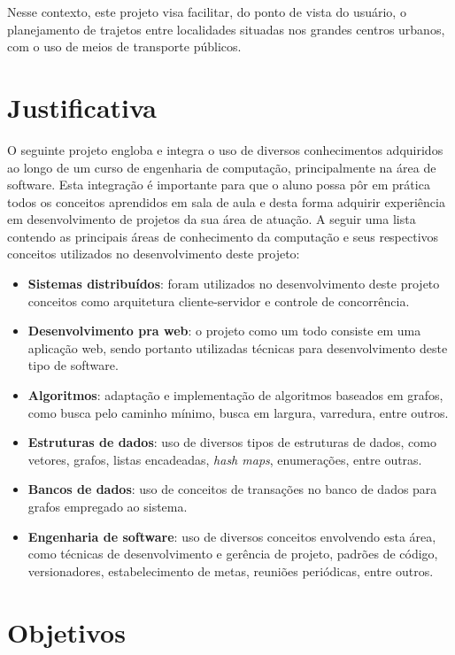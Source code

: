 Nesse contexto, este projeto visa facilitar, do ponto de vista do usuário, o planejamento de trajetos entre localidades situadas nos grandes centros urbanos, com o uso de meios de transporte públicos.

\section{Justificativa}
O seguinte projeto engloba e integra o uso de diversos conhecimentos adquiridos ao longo de um curso de engenharia de computação, principalmente na área de software.
Esta integração é importante para que o aluno possa pôr em prática todos os conceitos aprendidos em sala de aula e desta forma adquirir experiência em desenvolvimento de projetos da sua área de atuação.
A seguir uma lista contendo as principais áreas de conhecimento da computação e seus respectivos conceitos utilizados no desenvolvimento deste projeto:

\begin{itemize}
	\item \textbf{Sistemas distribuídos}: foram utilizados no desenvolvimento deste projeto conceitos como arquitetura cliente-servidor e controle de concorrência.
	\item \textbf{Desenvolvimento pra web}: o projeto como um todo consiste em uma aplicação web, sendo portanto utilizadas técnicas para desenvolvimento deste tipo de 	software.
	\item \textbf{Algoritmos}: adaptação e implementação de algoritmos baseados em grafos, como busca pelo caminho mínimo, busca em largura, varredura, entre outros.
	\item \textbf{Estruturas de dados}: uso de diversos tipos de estruturas de dados, como vetores, grafos, listas encadeadas, \emph{hash maps}, enumerações, entre 		outras.
	\item \textbf{Bancos de dados}: uso de conceitos de transações no banco de dados para grafos empregado ao sistema. 
	\item \textbf{Engenharia de software}: uso de diversos conceitos envolvendo esta área, como técnicas de desenvolvimento e gerência de projeto, padrões de código, 		versionadores, estabelecimento de metas, reuniões periódicas, entre outros.
\end{itemize}

\section{Objetivos}

